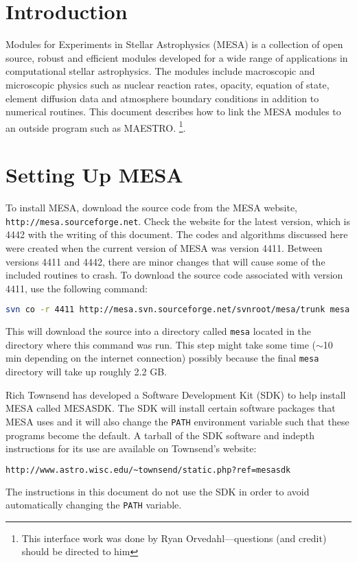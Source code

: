
\section{Introduction}

Modules for Experiments in Stellar Astrophysics ({\sf MESA}) is a collection 
of open source, robust and efficient modules developed for a wide range of 
applications in computational stellar astrophysics. The modules include 
macroscopic and microscopic physics such as nuclear reaction rates, opacity, 
equation of state, element diffusion data and atmosphere boundary conditions 
in addition to numerical routines. This document describes how to link the 
{\sf MESA} modules to an outside program such as {\sf MAESTRO}.
\footnote{This
  interface work was done by Ryan Orvedahl---questions (and credit)
  should be directed to him}.



\section{Setting Up {\sf MESA}}
\label{sec:setupmesa}

To install {\sf MESA}, download the source code from the {\sf MESA} website, 
{\tt http://mesa.sourceforge.net}. Check the website for the latest version, 
which is 4442 with the writing of this document. The codes and algorithms 
discussed here were created when the current version of {\sf MESA} was 
version 4411. Between versions 4411 and 4442, there are minor changes that 
will cause some of the included routines to crash. To download the source code 
associated with version 4411, use the following command:
\begin{lstlisting}[language=bash,mathescape=false]
  svn co -r 4411 http://mesa.svn.sourceforge.net/svnroot/mesa/trunk mesa
\end{lstlisting}
This will download the source into a directory called {\tt mesa} located 
in the directory where this command was run. This step might take some time 
($\sim$10 min depending on the internet connection) possibly because the 
final {\tt mesa} directory will take up roughly 2.2 GB.

Rich Townsend has developed a Software Development Kit (SDK) to help install 
{\sf MESA} called {\sf MESASDK}. The SDK will install certain software 
packages that {\sf MESA} uses and it will also change the {\tt PATH} 
environment variable such that these programs become the default. A tarball 
of the SDK software and indepth instructions for its use are available on 
Townsend's website:
\begin{lstlisting}[language=html,mathescape=false]
  http://www.astro.wisc.edu/~townsend/static.php?ref=mesasdk
\end{lstlisting}
The instructions in this document do not use the SDK in order to avoid 
automatically changing the {\tt PATH} variable.

